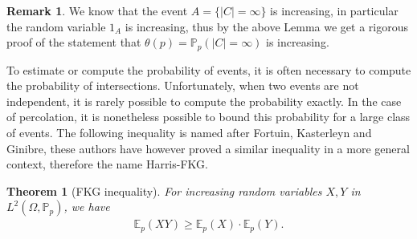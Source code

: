 \documentclass[12pt,a4paper]{article}
\newtheorem{thm}{Theorem}[section]
\theoremstyle{definition}
\newtheorem{rem}{Remark}[section]
\begin{document}
\begin{rem} We know that the event $A= \{ |C| = \infty\}$ is increasing, in particular the random variable $1_A$ is increasing, thus by the above Lemma we get a rigorous proof of the statement that $\theta(p)= \mathbb{P}_p( |C| = \infty)$ is increasing. 
\end{rem}
To estimate or compute the probability of events, it is often necessary to compute the probability of intersections. Unfortunately,  when two events are not independent, it is rarely possible to compute the probability exactly. In the case of percolation, it is nonetheless possible to bound this probability for a large class of events. The following inequality is named after Fortuin, Kasterleyn and Ginibre, these authors have however proved a similar inequality in a more general context, therefore the name Harris-FKG. 
\begin{thm}[FKG inequality] For increasing random variables $X,Y$ in $L^2( \Omega, \mathbb{P}_p)$, we have 
\begin{align*}
\mathbb{E}_p(XY) \geq \mathbb{E}_p(X) \cdot  \mathbb{E}_p(Y).
\end{align*}
\end{thm}
\end{document}

